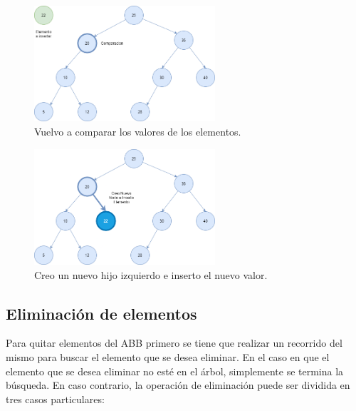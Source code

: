 \documentclass[titlepage,a4paper]{article}
\begin{document}
\begin{figure}[H]
\centering
\includegraphics[width=0.6\textwidth]{insercion_4.png}
\caption{\label{fig:seq06}Vuelvo a comparar los valores de los elementos.}
\end{figure}

\begin{figure}[H]
\centering
\includegraphics[width=0.6\textwidth]{insercion_5.png}
\caption{\label{fig:seq07}Creo un nuevo hijo izquierdo e inserto el nuevo valor.}
\end{figure}


										 \subsection{Eliminación de elementos}

Para quitar elementos del ABB primero se tiene que realizar un recorrido del
mismo para buscar el elemento que se desea eliminar. En el caso en que el
elemento que se desea eliminar no esté en el árbol, simplemente se termina
la búsqueda. En caso contrario, la operación de eliminación puede ser dividida
en tres casos particulares:
\end{document}
